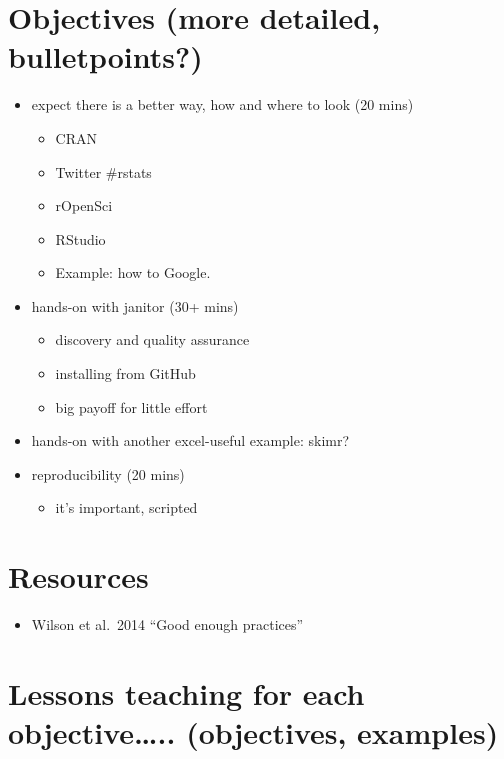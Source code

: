 \documentclass[]{book}
\providecommand{\tightlist}{%
  \setlength{\itemsep}{0pt}\setlength{\parskip}{0pt}}
\begin{document}
\hypertarget{objectives-more-detailed-bulletpoints-3}{%
\section{Objectives (more detailed, bulletpoints?)}\label{objectives-more-detailed-bulletpoints-3}}

\begin{itemize}
\tightlist
\item
  expect there is a better way, how and where to look (20 mins)

  \begin{itemize}
  \tightlist
  \item
    CRAN
  \item
    Twitter \#rstats
  \item
    rOpenSci
  \item
    RStudio
  \item
    Example: how to Google.
  \end{itemize}
\item
  hands-on with janitor (30+ mins)

  \begin{itemize}
  \tightlist
  \item
    discovery and quality assurance
  \item
    installing from GitHub
  \item
    big payoff for little effort
  \end{itemize}
\item
  hands-on with another excel-useful example: skimr?\\
\item
  reproducibility (20 mins)

  \begin{itemize}
  \tightlist
  \item
    it's important, scripted
  \end{itemize}
\end{itemize}

\hypertarget{resources-5}{%
\section{Resources}\label{resources-5}}

\begin{itemize}
\tightlist
\item
  Wilson et al.~2014 ``Good enough practices''
\end{itemize}

\hypertarget{lessons-teaching-for-each-objective..-objectives-examples-1}{%
\section{Lessons teaching for each objective\ldots{}.. (objectives, examples)}\label{lessons-teaching-for-each-objective..-objectives-examples-1}}
\end{document}
